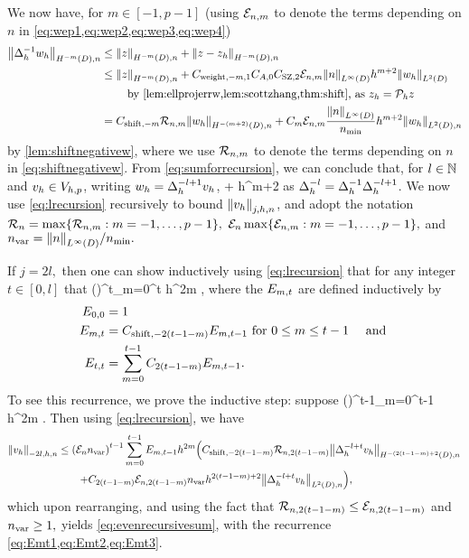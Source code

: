 We now have, for $m \in [-1,p-1]$ (using $\mathcal E_{n,m}$ to denote the terms depending on $n$ in \cref{eq:wep1,eq:wep2,eq:wep3,eq:wep4})
\begin{align}
\NHnfn{-m}{D}{\DeltahI \wh} &\leq \NHnfn{-m}{D}{z} + \NHnfn{-m}{D}{z-\zh}\nonumber\\
&\leq \NHnfn{-m}{D}{z} + \Cwfn{-m,1}  \CAfn{0} \CSZfn{2} \errn{m} \NLiD{n} h^{m+2} \NLtD{\wh}\nonumber\\
&\quad\quad\text{ by \cref{lem:ellprojerrw,lem:scottzhang,thm:shift}, as }\zh = \Ph z\nonumber\\
&= \Cshiftfn{m} \shiftn{m} \NHnfn{-(m+2)}{D}{\wh} + \Cm \errn{m} \frac{\NLiD{n}}{\nmin} h^{m+2} \NLtDn{\wh}\label{eq:sumforrecursion}
\end{align}
by \cref{lem:shiftnegativew}, where we use $\mathcal R_{n,m}$ to denote the terms depending on $n$ in \cref{eq:shiftnegativew}.
From \cref{eq:sumforrecursion}, we can conclude that, for $l \in \mathbb N$ and $v_{h} \in V_{h,p}$, writing $w_{h} = \Delta_{h}^{-l+1} v_{h}$,
\beq\label{eq:lrecursion}
 \leq {}  + \Cm {}  h^{m+2} \NLtDn{\Deltahmlpo \vh}
\eeq
as $\Delta_{h}^{-l} = \Delta_{h}^{-1} \Delta_{h}^{-l+1}$. We now use \cref{eq:lrecursion} recursively to bound $\Nfn{j,h,n}{\vh}$, and adopt the notation $\Rn = \max\set{\shiftn{m}\st m = -1,\ldots,p-1},$ $\En\max\set{\errn{m}\st m = -1,\ldots,p-1},$ and $\nvar = \NLiD{n}/\nmin.$

If $j = 2l,$ then one can show inductively using \cref{eq:lrecursion} that for any integer $t \in [0,l]$ that
\beq\label{eq:evenrecursivesum}
 \leq \mleft(\En\nvar\mright)^t\sum_{m=0}^t  h^{2m}  ,
\eeq
where the $E_{m,t}$ are defined inductively by
\begin{align}
\label{eq:Emt1}E_{0,0} &=1\\
\label{eq:Emt2}E_{m,t} &= C_{\mathrm{shift},-2(t-1-m)} E_{m,t-1} \text{ for } 0 \leq m \leq t-1 \quad\text{ and }\\
\label{eq:Emt3}E_{t,t} &= \sum_{m=0}^{t-1} C_{2(t-1-m)} E_{m,t-1}.
\end{align}
To see this recurrence, we prove the inductive step: suppose
\beqs
{} \leq \mleft(\En\nvar\mright)^{t-1}\sum_{m=0}^{t-1}  h^{2m} .
\eeqs
Then using \cref{eq:lrecursion}, we have
\begin{align*}
\Nfn{-2l,h,n}{\vh} &\leq \mleft(\En\nvar\mright)^{t-1}\sum_{m=0}^{t-1} \Efn{m,t-1} h^{2m} \mleft(\Cshiftfn{2(t-1-m)}\shiftn{2(t-1-m)} \NHnfn{-(2(t-1-m)+2}{D}{\Deltah^{-l+t} \vh}\mright.\\
&\quad\quad\mleft.+ \Cfn{2(t-1-m)} \errn{2(t-1-m)} \nvar h^{2(t-1-m)+2} \NLtDn{\Deltah^{-l+t} \vh}\mright),
\end{align*}
which upon rearranging, and using the fact that $\mathcal R_{n,2(t-1-m)} \leq \mathcal E_{n,2(t-1-m)}$ and $n_{\mathrm{var}} \geq 1,$ yields \cref{eq:evenrecursivesum}, with the recurrence \cref{eq:Emt1,eq:Emt2,eq:Emt3}.

